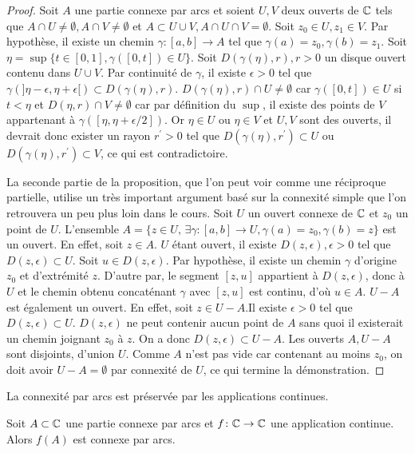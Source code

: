 \begin{proof}
Soit $A$ une partie connexe par arcs et soient $U,V$ deux ouverts de $\mathbb{C}$ tels que $A \cap U \neq \emptyset, A \cap V \neq \emptyset$ et $A \subset U \cup V, A \cap U \cap V = \emptyset$. Soit $z_0 \in U, z_1 \in V$. Par hypothèse, il existe un chemin $\gamma \colon [a,b] \to A$ tel que $\gamma(a) = z_0, \gamma(b)= z_1$. Soit $\eta = \sup \{ t \in [0,1], \gamma([0,t]) \in U\}$. Soit $D(\gamma(\eta),r), r >0$ un disque ouvert contenu dans $U\cup V$. Par continuité de $\gamma$, il existe $\epsilon > 0$ tel que $\gamma(]\eta-\epsilon, \eta +\epsilon[) \subset D(\gamma(\eta),r)$. $D(\gamma(\eta),r)\cap U \neq \emptyset$ car $\gamma([0,t]) \in U$ si $t < \eta$ et $D(\eta,r) \cap V \neq \emptyset$ car par définition du $\sup$, il existe des points de $V$ appartenant à $\gamma([\eta,\eta + \epsilon/2])$. Or $\eta \in U$ ou $\eta \in V$ et $U,V$ sont des ouverts, il devrait donc exister un rayon $r^\prime > 0$ tel que $D(\gamma(\eta),r^\prime)\subset U$ ou $D(\gamma(\eta),r^\prime)\subset V$, ce qui est contradictoire. 

La seconde partie de la proposition, que l'on peut voir comme une réciproque partielle, utilise un très important argument basé sur la connexité simple que l'on retrouvera un peu plus loin dans le cours. Soit $U$ un ouvert connexe de $\mathbb{C}$ et $z_0$ un point de $U$. L'ensemble $A=\{ z \in U , \, \exists \gamma \colon [a,b] \to U, \gamma(a)=z_0, \gamma(b) = z\}$ est un ouvert. En effet, soit $z \in A$. $U$ étant ouvert, il existe $D(z, \epsilon), \epsilon > 0$ tel que $D(z,\epsilon) \subset U$. Soit $u \in D(z,\epsilon)$. Par hypothèse, il existe un chemin $\gamma$ d'origine $z_0$ et d'extrémité $z$. D'autre par, le segment $[z,u]$ appartient à $D(z, \epsilon)$, donc à $U$ et le chemin obtenu concaténant $\gamma$ avec $[z,u]$ est continu, d'où $u \in A$. $U-A$ est également un ouvert. En effet, soit $z \in U-A$.Il existe $\epsilon > 0$ tel que $D(z,\epsilon) \subset U$. $D(z,\epsilon)$ ne peut contenir aucun point de $A$ sans quoi il existerait un chemin joignant $z_0$ à $z$. On a donc $D(z,\epsilon) \subset U-A$. Les ouverts $A,U-A$ sont disjoints, d'union $U$. Comme $A$ n'est pas vide car contenant au moins $z_0$, on doit avoir $U-A=\emptyset$ par connexité de $U$, ce qui termine la démonstration.
\end{proof}
La connexité par arcs est préservée par les applications continues.
\begin{fprop}
Soit $A \subset \mathbb{C}$ une partie connexe par arcs et $f \colon \mathbb{C} \to \mathbb{C}$ une application continue. Alors $f(A)$ est connexe par arcs.
\end{fprop}
